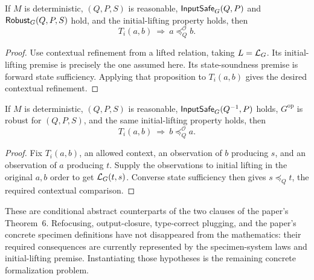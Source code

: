 \begin{theorem}
If $M$ is deterministic, $(Q,P,S)$ is reasonable,
$\mathsf{InputSafe}_G(Q,P)$ and $\mathsf{Robust}_G(Q,P,S)$ hold, and the initial-lifting
property holds, then
\[
 T_i(a,b)\ \Longrightarrow\ a\preceq_Q^{\mathcal O}b.
\]
\end{theorem}
\begin{proof}
Use contextual refinement from a lifted relation, taking $L=\mathcal L_G$.
Its initial-lifting premise is precisely the one assumed here. Its
state-soundness premise is forward state sufficiency. Applying that
proposition to $T_i(a,b)$ gives the desired contextual refinement.
\end{proof}

\begin{theorem}
If $M$ is deterministic, $(Q,P,S)$ is reasonable,
$\mathsf{InputSafe}_G(Q^{-1},P)$ holds, $G^{\mathrm{op}}$ is robust for
$(Q,P,S)$, and the same initial-lifting property holds, then
\[
 T_i(a,b)\ \Longrightarrow\ b\preceq_Q^{\mathcal O}a.
\]
\end{theorem}
\begin{proof}
Fix $T_i(a,b)$, an allowed context, an observation of $b$ producing
$s$, and an observation of $a$ producing $t$. Supply the observations
to initial lifting in the original $a,b$ order to get $\mathcal L_G(t,s)$.
Converse state sufficiency then gives $s\preceq_Q t$, the required
contextual comparison.
\end{proof}

These are conditional abstract counterparts of the two clauses of the
paper's Theorem~6. Refocusing, output-closure, type-correct plugging, and
the paper's concrete specimen definitions have not disappeared from the
mathematics: their required consequences are currently represented by
the specimen-system laws and initial-lifting premise. Instantiating
those hypotheses is the remaining concrete formalization problem.
